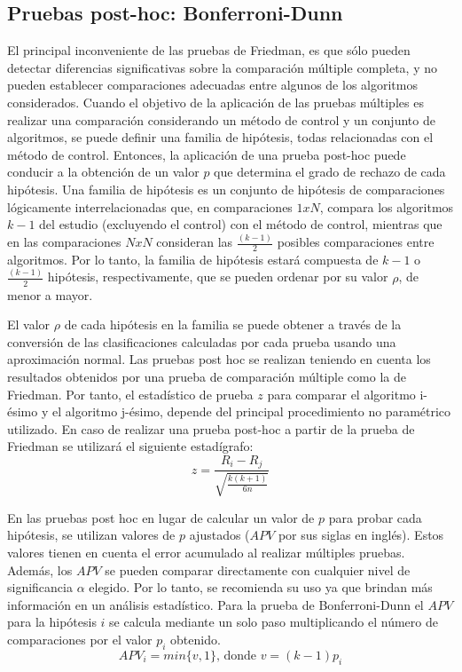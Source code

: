 \subsection{Pruebas post-hoc: Bonferroni-Dunn}
El principal inconveniente de las pruebas de Friedman, es que sólo pueden detectar diferencias significativas sobre la comparación múltiple completa, y no pueden establecer comparaciones adecuadas entre algunos de los algoritmos considerados. Cuando el objetivo de la aplicación de las pruebas múltiples es realizar una comparación considerando un método de control y un conjunto de algoritmos, se puede definir una familia de hipótesis, todas relacionadas con el método de control. Entonces, la aplicación de una prueba post-hoc puede conducir a la obtención de un valor $p$ que determina el grado de rechazo de cada hipótesis. Una familia de hipótesis es un conjunto de hipótesis de comparaciones lógicamente interrelacionadas que, en comparaciones $1 x N$, compara los algoritmos $k - 1$ del estudio (excluyendo el control) con el método de control, mientras que en las comparaciones $NxN$ consideran las $\frac{(k-1)}{2}$ posibles comparaciones entre algoritmos. Por lo tanto, la familia de hipótesis estará compuesta de $k - 1$ o $\frac{(k-1)}{2}$ hipótesis, respectivamente, que se pueden ordenar por su valor $\rho$, de menor a mayor.

El valor $\rho$ de cada hipótesis en la familia se puede obtener a través de la conversión de las clasificaciones calculadas por cada prueba usando una aproximación normal. Las pruebas post hoc se realizan teniendo en cuenta los resultados obtenidos por una prueba de comparación múltiple como la de Friedman. Por tanto, el estadístico de prueba $z$ para comparar el algoritmo i-ésimo y el algoritmo j-ésimo, depende del principal procedimiento no paramétrico utilizado. En caso de realizar una prueba post-hoc a partir de la prueba de Friedman se utilizará el siguiente estadígrafo:
\begin{equation}
z=\frac{R_i-R_j}{\sqrt{\frac{k(k+1)}{6n}}}
\end{equation}

En las pruebas post hoc en lugar de calcular un valor de $p$ para probar cada hipótesis, se utilizan valores de $p$ ajustados ($APV$ por sus siglas en inglés). Estos valores tienen en cuenta el error acumulado al realizar múltiples pruebas. Además, los $APV$ se pueden comparar directamente con cualquier nivel de significancia $\alpha$ elegido. Por lo tanto, se recomienda su uso ya que brindan más información en un análisis estadístico. Para la prueba de Bonferroni-Dunn el $APV$ para la hipótesis $i$ se calcula mediante un solo paso multiplicando el número de comparaciones por el valor $p_i$ obtenido.
\begin{equation}
APV_i=min \{v,1\} \text{, donde } v=(k-1)p_i
\end{equation}




